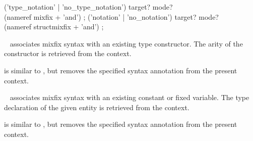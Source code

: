 \begin{isabellebody}
\begin{isamarkuptext}
  \begin{rail}
    ('type\_notation' | 'no\_type\_notation') target? mode? \\ (nameref mixfix + 'and')
    ;
    ('notation' | 'no\_notation') target? mode? \\ (nameref structmixfix + 'and')
    ;
  \end{rail}

  \begin{description}

  \item \hyperlink{command.type-notation}{\mbox{}}~ associates mixfix
  syntax with an existing type constructor.  The arity of the
  constructor is retrieved from the context.
  
  \item \hyperlink{command.no-type-notation}{\mbox{}} is similar to \hyperlink{command.type-notation}{\mbox{}}, but removes the specified syntax annotation from
  the present context.

  \item \hyperlink{command.notation}{\mbox{}}~ associates mixfix
  syntax with an existing constant or fixed variable.  The type
  declaration of the given entity is retrieved from the context.
  
  \item \hyperlink{command.no-notation}{\mbox{}} is similar to \hyperlink{command.notation}{\mbox{}},
  but removes the specified syntax annotation from the present
  context.

  \end{description}


\end{isamarkuptext}
\end{isabellebody}
